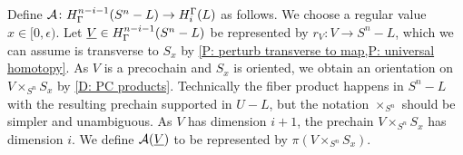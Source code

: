 Define $\mathcal{A} \colon H^{n-i-1}_\Gamma(S^n-L) \to H_i^\Gamma(L)$ as follows.
We choose a regular value $x \in [0,\epsilon)$.
Let $\underline{V} \in H^{n-i-1}_\Gamma(S^n-L)$ be represented by $r_V \colon V \to S^n - L$, which we can assume is transverse to $S_x$ by \cref{P: perturb transverse to map,P: universal homotopy}.
As $V$ is a precochain and $S_x$ is oriented, we obtain an orientation on $V \times_{S^n} S_x$ by \cref{D: PC products}.
Technically the fiber product happens in $S^n-L$ with the resulting prechain supported in $U-L$, but the notation $\times_{S^n}$ should be simpler and unambiguous.
As $V$ has dimension $i+1$, the prechain $V \times_{S^n} S_x$ has dimension $i$.
We define $\mathcal{A}(\underline{V})$ to be represented by $\pi(V \times_{S^n} S_x)$.



